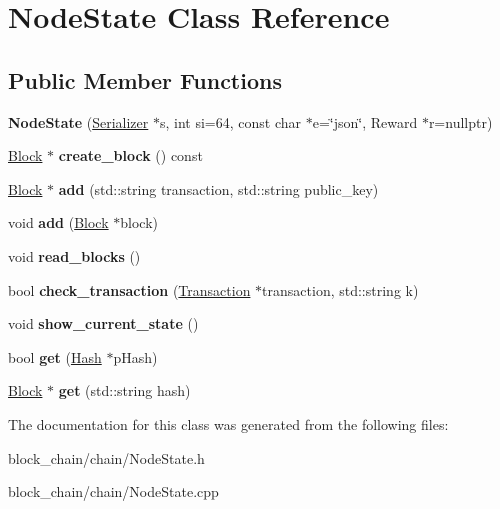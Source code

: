 \hypertarget{classNodeState}{}\section{Node\+State Class Reference}
\label{classNodeState}
\subsection*{Public Member Functions}
\begin{DoxyCompactItemize}
\item 
\mbox{\label{classNodeState_ab8efdcd562f3122b88f0959f5e3b5fed}} 
{\bfseries Node\+State} (\mbox{\hyperlink{classSerializer}{Serializer}} $\ast$s, int si=64, const char $\ast$e=\char`\"{}json\char`\"{}, Reward $\ast$r=nullptr)
\item 
\mbox{\label{classNodeState_a132d657fd8413e9f7eb92237cc66b38c}} 
\mbox{\hyperlink{classBlock}{Block}} $\ast$ {\bfseries create\+\_\+block} () const
\item 
\mbox{\label{classNodeState_a010b7e7cb6d050a2d78962e6532aea9d}} 
\mbox{\hyperlink{classBlock}{Block}} $\ast$ {\bfseries add} (std\+::string transaction, std\+::string public\+\_\+key)
\item 
\mbox{\label{classNodeState_a75e2e94448c4b5579b93b5c2fc0671b9}} 
void {\bfseries add} (\mbox{\hyperlink{classBlock}{Block}} $\ast$block)
\item 
\mbox{\label{classNodeState_ae2e3a8a54ab5276bf469af2cf2107f2b}} 
void {\bfseries read\+\_\+blocks} ()
\item 
\mbox{\label{classNodeState_ad8fac1372753ec35c9fcee92f71d75d6}} 
bool {\bfseries check\+\_\+transaction} (\mbox{\hyperlink{classTransaction}{Transaction}} $\ast$transaction, std\+::string k)
\item 
\mbox{\label{classNodeState_aedd8b10b2ca3f51e5c95b7ebed70464c}} 
void {\bfseries show\+\_\+current\+\_\+state} ()
\item 
\mbox{\label{classNodeState_a771321e4b2c56515ffb79e57da71db30}} 
bool {\bfseries get} (\mbox{\hyperlink{classHash}{Hash}} $\ast$p\+Hash)
\item 
\mbox{\label{classNodeState_a1b3cbb68fa90d82c45f682a78eb95656}} 
\mbox{\hyperlink{classBlock}{Block}} $\ast$ {\bfseries get} (std\+::string hash)
\end{DoxyCompactItemize}


The documentation for this class was generated from the following files\+:\begin{DoxyCompactItemize}
\item 
block\+\_\+chain/chain/Node\+State.\+h\item 
block\+\_\+chain/chain/Node\+State.\+cpp\end{DoxyCompactItemize}
